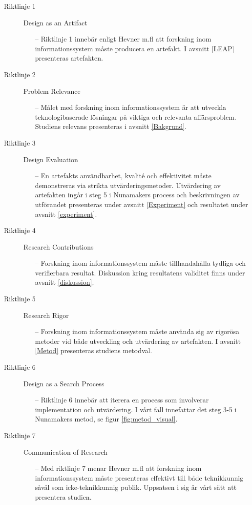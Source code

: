 \documentclass[a4paper,11pt]{article}
\begin{document}
{\begin{description}
    \item [Riktlinje 1]
    Design as an Artifact
    \begin{itemize}
    \item [--] Riktlinje 1 innebär enligt Hevner m.fl att forskning inom informationssystem måste producera en artefakt. I avsnitt \ref{LEAP} presenteras artefakten.
    \end{itemize}
    \item [Riktlinje 2]
    Problem Relevance
     \begin{itemize}
    \item [--] Målet med forskning inom informationssystem är att utveckla teknologibaserade lösningar på viktiga och relevanta affärsproblem. Studiens relevans presenteras i avsnitt \ref{Bakgrund}.
    \end{itemize}
    \item [Riktlinje 3]
    Design Evaluation
     \begin{itemize}
    \item [--] En artefakts användbarhet, kvalité och effektivitet måste demonstreras via strikta utvärderingsmetoder. Utvärdering av artefakten ingår i steg 5 i Nunamakers process och beskrivningen av utförandet presenteras under avsnitt \ref{Experiment} och resultatet under avsnitt \ref{experiment}.
    \end{itemize}
    \newpage
    \item [Riktlinje 4]
    Research Contributions
     \begin{itemize}
    \item [--] Forskning inom informationssystem måste tillhandahålla tydliga och verifierbara resultat. Diskussion kring resultatens validitet finns under avsnitt \ref{diskussion}.
    \end{itemize}
    \item [Riktlinje 5]
    Research Rigor
     \begin{itemize}
    \item [--] Forskning inom informationssystem måste använda sig av rigorösa metoder vid både utveckling och utvärdering av artefakten. I avsnitt \ref{Metod} presenteras studiens metodval.
    \end{itemize}
    \item [Riktlinje 6]
    Design as a Search Process
     \begin{itemize}
    \item [--] Riktlinje 6 innebär att iterera en process som involverar implementation och utvärdering. I vårt fall innefattar det steg 3-5 i Nunamakers metod, se figur \ref{fig:metod_visual}. 
    \end{itemize}
    \item [Riktlinje 7]
    Communication of Research
     \begin{itemize}
    \item [--] Med riktlinje 7 menar Hevner m.fl att forskning inom informationssystem måste presenteras effektivt till både teknikkunnig såväl som icke-teknikkunnig publik. Uppsatsen i sig är vårt sätt att presentera studien. 
    \end{itemize}
\end{description}

}
\end{document}
